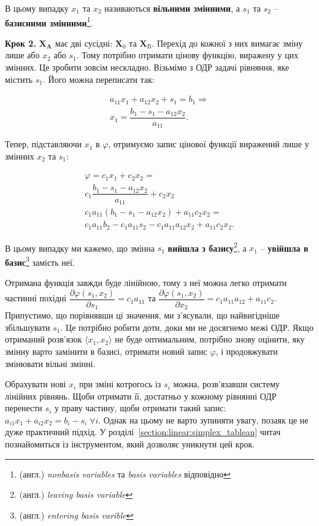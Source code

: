 \documentclass[\main/book.tex]{subfiles}
\begin{document}
В цьому випадку $x_1$ та $x_2$ називаються \textbf{вільними змінними}, а $s_1$ та $s_2$ -- \textbf{базисними змінними}\footnote{(англ.) \textit{nonbasis variables} та \textit{basis variables} відповідно}.

\textbf{Крок 2.}  $\mathbf{X}_\mathbf{A}$ має дві сусідні: $\mathbf{X}_0$ та $\mathbf{X}_\mathrm{B}$. Перехід до кожної з них вимагає зміну лише або $x_2$ або $s_1$. Тому потрібно отримати цінову функцію, виражену у цих змінних. Це зробити зовсім нескладно. Візьмімо з ОДР задачі рівняння, яке містить $s_1$. Його можна переписати так:
 
 \[
 \begin{split}
  a_{11} x_1 + a_{12} x_2 + s_1 = b_1 \Rightarrow \\
  x_1 = \dfrac{b_1 - s_1 - a_{12} x_2}{a_{11}}.
 \end{split}
 \]
 
Тепер, підставляючи $x_1$ в $\varphi$, отримуємо запис цінової функції виражений лише у змінних $x_2$ та $s_1$:
 
\[
  \begin{split}
   \varphi = c_1 x_1 + c_2 x_2 = \\
   c_1 \dfrac{b_1 - s_1 - a_{12} x_2}{a_{11}} + c_2 x_2 \\
   c_1 a_{11} (b_1 - s_1 - a_{12} x_2) + a_{11} c_2 x_2 = \\
   c_1 a_{11} b_2 - c_1 a_{11} s_2 - c_1 a_{11} a_{12} x_2 + a_{11} c_2 x_2.
  \end{split}
\]

В цьому випадку ми кажемо, що змінна $s_1$ \textbf{вийшла з базису}\footnote{(англ.) \textit{leaving basis variable}}, а $x_1$ -- \textbf{увійшла в базис}\footnote{(англ.) \textit{entering basis varible}} замість неї.

Отримана функція завжди буде лінійною, тому з неї можна легко отримати частинні похідні $\dfrac{\partial \varphi(s_1, x_2)}{\partial s_1} = c_1 a_{11}$ та $\dfrac{\partial \varphi(s_1, x_2)}{\partial x_2} = c_1 a_{11} a_{12} + a_{11} c_2$. Припустимо, що порівнявши ці значення, ми з'ясували, що найвигідніше збільшувати $s_1$. Це потрібно робити доти, доки ми не досягнемо межі ОДР. Якщо отриманий розв'язок ${\langle x_1, x_2 \rangle}$ не буде оптимальним, потрібно знову оцінити, яку змінну варто замінити в базисі, отримати новий запис $\varphi$, і продовжувати змінювати вільні змінні.

\begin{note}
 Обрахувати нові $x_i$ при зміні котрогось із $s_i$ можна, розв'язавши систему лінійних рівнянь. Щоби отримати її, достатньо у кожному рівнянні ОДР перенести $s_i$ у праву частину, щоби отримати такий запис: $a_{i1} x_1 + a_{i2} x_2 = b_i - s_i \; \forall i$. Однак на цьому не варто зупиняти увагу, позаяк це не дуже практичний підхід. У розділі~\ref{section:linear:simplex_tableau} читач познайомиться із інструментом, який дозволяє уникнути цей крок.
\end{note}
\end{document}
